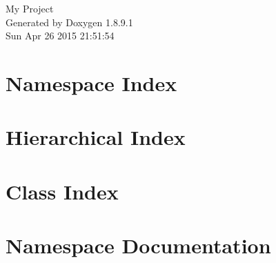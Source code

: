 \documentclass[twoside]{book}
\newcommand{\+}{\discretionary{\mbox{\scriptsize$\hookleftarrow$}}{}{}}
\newcommand{\clearemptydoublepage}{%
  \newpage{\pagestyle{empty}\cleardoublepage}%
}
\begin{document}
\hypersetup{pageanchor=false,
             bookmarks=true,
             bookmarksnumbered=true,
             pdfencoding=unicode
            }
\begin{titlepage}
\vspace*{7cm}
\begin{center}%
{\Large My Project }\\
\vspace*{1cm}
{\large Generated by Doxygen 1.8.9.1}\\
\vspace*{0.5cm}
{\small Sun Apr 26 2015 21:51:54}\\
\end{center}
\end{titlepage}
\clearemptydoublepage
\tableofcontents
\clearemptydoublepage
{}
\hypersetup{pageanchor=true}

\chapter{Namespace Index}

\chapter{Hierarchical Index}

\chapter{Class Index}

\chapter{Namespace Documentation}








\end{document}
